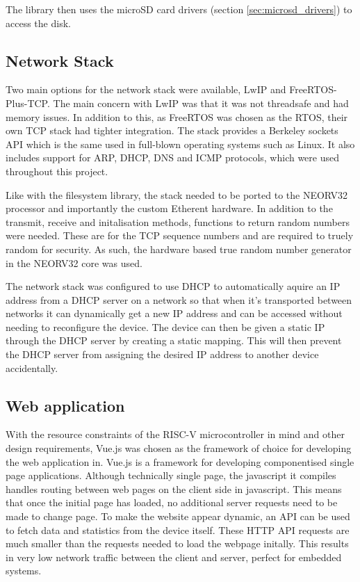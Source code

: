 The library then uses the microSD card drivers (section \ref{sec:microsd_drivers}) to access the disk. 


\subsection{Network Stack}
\label{sec:freertos_tcpip_stack}

Two main options for the network stack were available, LwIP and FreeRTOS-Plus-TCP. The main concern with LwIP was that it was not threadsafe and had memory issues. In addition to this, as FreeRTOS was chosen as the RTOS, their own TCP stack had tighter integration. The stack provides a Berkeley sockets API which is the same used in full-blown operating systems such as Linux. It also includes support for ARP, DHCP, DNS and ICMP protocols, which were used throughout this project. 

Like with the filesystem library, the stack needed to be ported to the NEORV32 processor and importantly the custom Etherent hardware. In addition to the transmit, receive and initalisation methods, functions to return random numbers were needed. These are for the TCP sequence numbers and are required to truely random for security. As such, the hardware based true random number generator in the NEORV32 core was used. 

The network stack was configured to use DHCP to automatically aquire an IP address from a DHCP server on a network so that when it's transported between networks it can dynamically get a new IP address and can be accessed without needing to reconfigure the device. The device can then be given a static IP through the DHCP server by creating a static mapping. This will then prevent the DHCP server from assigning the desired IP address to another device accidentally. 

\subsection{Web application}
With the resource constraints of the RISC-V microcontroller in mind and other design requirements, Vue.js was chosen as the framework of choice for developing the web application in. Vue.js is a framework for developing componentised single page applications. Although technically single page, the javascript it compiles handles routing between web pages on the client side in javascript. This means that once the initial page has loaded, no additional server requests need to be made to change page. To make the website appear dynamic, an API can be used to fetch data and statistics from the device itself. These HTTP API requests are much smaller than the requests needed to load the webpage initally. This results in very low network traffic between the client and server, perfect for embedded systems. 

